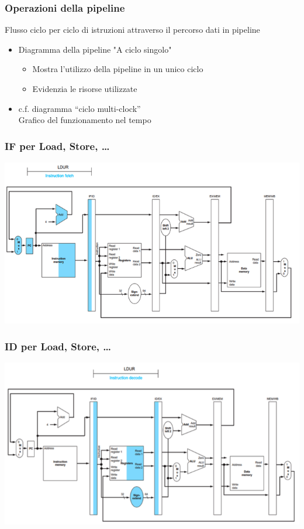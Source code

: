 \documentclass[12pt,a4paper]{article}
\begin{document}
\subsubsection{Operazioni della pipeline}
Flusso ciclo per ciclo di istruzioni attraverso il percorso dati in pipeline
\begin{itemize}
\item Diagramma della pipeline "A ciclo singolo"
\begin{itemize}
\item Mostra l'utilizzo della pipeline in un unico ciclo
\item Evidenzia le risorse utilizzate
\end{itemize}
\item c.f. diagramma “ciclo multi-clock”\\
Grafico del funzionamento nel tempo
\end{itemize}

\subsubsection{IF per Load, Store, \dots}
\begin{center}
\includegraphics[width=0.6\columnwidth]{img/pipeline_if.png}
\end{center}

\subsubsection{ID per Load, Store, \dots}
\begin{center}
\includegraphics[width=0.6\columnwidth]{img/pipeline_id.png}
\end{center}
\end{document}
